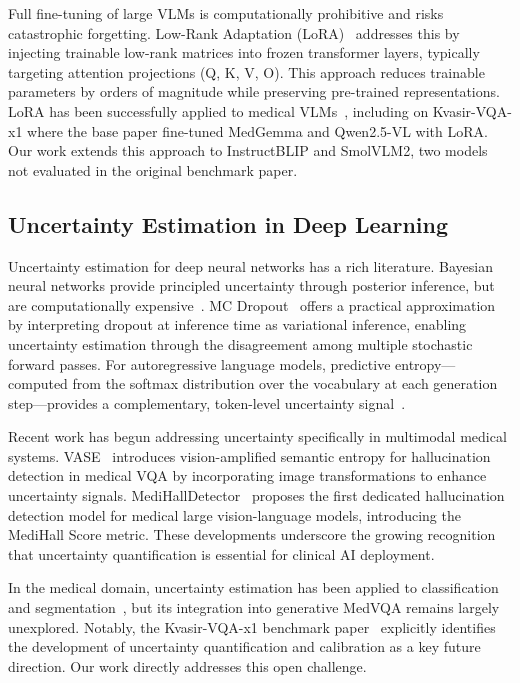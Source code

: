 \documentclass[pdflatex,sn-mathphys-num]{sn-jnl}
\begin{document}
Full fine-tuning of large VLMs is computationally prohibitive and risks catastrophic forgetting. Low-Rank Adaptation (LoRA)~\cite{hu2022lora} addresses this by injecting trainable low-rank matrices into frozen transformer layers, typically targeting attention projections (Q, K, V, O). This approach reduces trainable parameters by orders of magnitude while preserving pre-trained representations. LoRA has been successfully applied to medical VLMs~\cite{gautam2025kvasirx1,moor2023med_flamingo}, including on Kvasir-VQA-x1 where the base paper fine-tuned MedGemma and Qwen2.5-VL with LoRA. Our work extends this approach to InstructBLIP and SmolVLM2, two models not evaluated in the original benchmark paper.

\subsection{Uncertainty Estimation in Deep Learning}

Uncertainty estimation for deep neural networks has a rich literature. Bayesian neural networks provide principled uncertainty through posterior inference, but are computationally expensive~\cite{blundell2015weight}. MC Dropout~\cite{gal2016dropout} offers a practical approximation by interpreting dropout at inference time as variational inference, enabling uncertainty estimation through the disagreement among multiple stochastic forward passes. For autoregressive language models, predictive entropy---computed from the softmax distribution over the vocabulary at each generation step---provides a complementary, token-level uncertainty signal~\cite{kadavath2022language,kuhn2023semantic}.

Recent work has begun addressing uncertainty specifically in multimodal medical systems. VASE~\cite{yu2025vase} introduces vision-amplified semantic entropy for hallucination detection in medical VQA by incorporating image transformations to enhance uncertainty signals. MediHallDetector~\cite{chen2025medihalldetector} proposes the first dedicated hallucination detection model for medical large vision-language models, introducing the MediHall Score metric. These developments underscore the growing recognition that uncertainty quantification is essential for clinical AI deployment.

In the medical domain, uncertainty estimation has been applied to classification~\cite{leibig2017retinal} and segmentation~\cite{jungo2019brain_seg}, but its integration into generative MedVQA remains largely unexplored. Notably, the Kvasir-VQA-x1 benchmark paper~\cite{gautam2025kvasirx1} explicitly identifies the development of uncertainty quantification and calibration as a key future direction. Our work directly addresses this open challenge.
\end{document}

